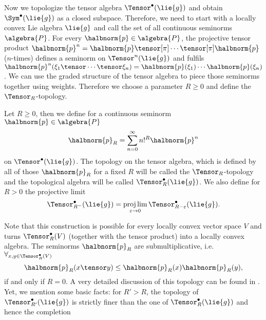 \documentclass[
11pt,                          %
english                        %
]{article}
\begin{document}
Now we topologize the tensor algebra $\Tensor^{\bullet}(\lie{g})$ and obtain 
$\Sym^{\bullet}(\lie{g})$ as a closed subspace. Therefore, we need to start with a 
locally convex Lie algebra $\lie{g}$ and call the set of all continuous seminorms 
$\algebra{P}$. For every $\halbnorm{p} \in \algebra{P}$, the projective tensor 
product $\halbnorm{p}^n = \halbnorm{p} \tensor[\pi] \cdots \tensor[\pi] 
\halbnorm{p}$ ($n$-times) defines a seminorm on $\Tensor^n(\lie{g})$ and fulfils 
$\halbnorm{p}^n(\xi_1 \tensor \cdots \tensor \xi_n) = \halbnorm{p}(\xi_1) \cdots 
\halbnorm{p}(\xi_n)$. We can use the graded structure of the tensor algebra to piece 
those seminorms together using weights. Therefore we choose a parameter $R \geq 0$ 
and define the $\Tensor_R$-topology.
\begin{definition}
	\label{def:TR-topology}
	Let $R \geq 0$, then we define for a continuous seminorm 
	$\halbnorm{p} \in \algebra{P}$
	\begin{equation}
		\label{def:TR-seminorms}
		\halbnorm{p}_R
		=
		\sum\limits_{n=0}^\infty
		n!^R \halbnorm{p}^n
	\end{equation}
	on $\Tensor^{\bullet}(\lie{g})$. The topology on the tensor algebra, which is
	defined by all of those $\halbnorm{p}_R$ for a fixed $R$ will be called the 
	$\Tensor_R$-topology and the topological algebra will be called 
	$\Tensor_R^{\bullet}(\lie{g})$. We also define for $R > 0$ the projective limit
	\begin{equation}
		\label{def:TR-projective}
		\Tensor_{R^-}^{\bullet}(\lie{g})
		=
		\projlim\limits_{\varepsilon \rightarrow 0}
		\Tensor_{R - \varepsilon}^{\bullet}(\lie{g}).
	\end{equation}
\end{definition}
Note that this construction is possible for every locally convex vector space $V$ 
and turns $\Tensor_R^{\bullet}(V)$ (together with the tensor product) into a locally 
convex algebra. The seminorms $\halbnorm{p}_R$ are submultiplicative, i.e. 
$\forall_{x, y \in \Tensor_R^{\bullet}(V)}$
\begin{equation}
	\label{eq:TR-submultiplicative}
	\halbnorm{p}_R(x \tensor y)
	\leq
	\halbnorm{p}_R(x)
	\halbnorm{p}_R(y),
\end{equation}
if and only if $R = 0$. A very detailed discussion of this topology can be found in 
\cite{waldmann:2014a}. Yet, we mention some basic facts: for $R' > R$, the 
topology of $\Tensor_{R'}^{\bullet}(\lie{g})$ is strictly finer than the one of 
$\Tensor_R^{\bullet}(\lie{g})$ and hence the completion 
\end{document}
